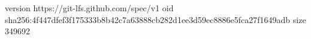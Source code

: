 version https://git-lfs.github.com/spec/v1
oid sha256:4f447dfef3f175333b8b42c7a63888cb282d1ee3d59ec8886e5fca27f1649adb
size 349692
